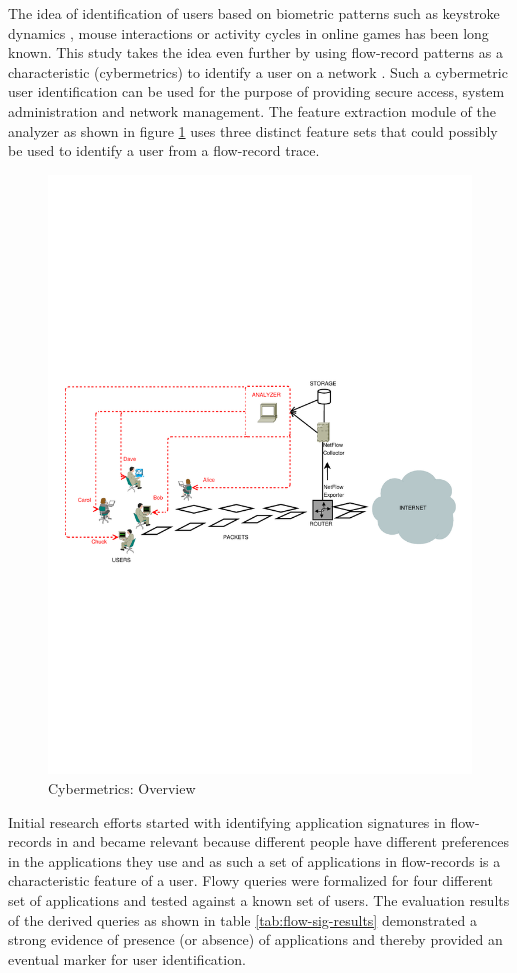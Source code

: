 The idea of identification of users based on biometric patterns such as keystroke dynamics \cite{fbergadano:2002}, mouse interactions \cite{aahmed:2007} or activity cycles in online games \cite{kchen:2007} has been long known. This study takes the idea even further by using flow-record patterns as a characteristic (cybermetrics) to identify a user on a network \cite{nmelnikov:thesis:2010, nmelnikov:2010}. Such a cybermetric user identification can be used for the purpose of providing secure access, system administration and network management. The feature extraction module of the analyzer as shown in figure \ref{fig:cybermetrics-overview} uses three distinct feature sets that could possibly be used to identify a user from a flow-record trace. 
\begin{figure}[h!]
\begin{center}
  \includegraphics* [width=0.7\linewidth]{figures/cybermetrics-overview}	
  \caption{Cybermetrics: Overview \cite{nmelnikov:thesis:2010}}
  \label{fig:cybermetrics-overview}
\end{center}
\end{figure}

Initial research efforts started with identifying application signatures in flow-records in \cite{vperelman:2011, vperelman:thesis:2010} and became relevant because different people have different preferences in the applications they use  and as such a set of applications in flow-records is a characteristic feature of a user. Flowy queries were formalized for four different set of applications and tested against a known set of users. The evaluation results of the derived queries as shown in table \ref{tab:flow-sig-results} demonstrated a strong evidence of presence (or absence) of applications and thereby provided an eventual marker for user identification. 


